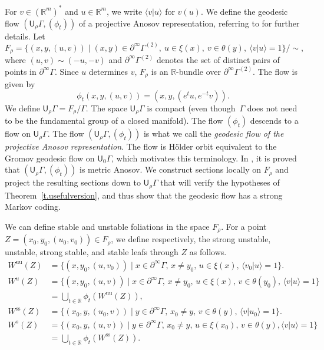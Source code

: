 \documentclass[10pt]{amsart}
\let\sep\mid
\newcommand{\sts}{\mathrm{ss}}
\newcommand{\uu}{\mathrm{uu}}
\theoremstyle{definition}
\numberwithin{equation}{section}
\begin{document}
For $v\in (\mathbb{R}^m)^*$ and $u\in\mathbb{R}^m$, we write $\langle v | u \rangle$ for $v(u)$. We define the geodesic flow $(\mathsf{U}_\rho\Gamma,(\phi_t))$ of a projective Anosov representation, referring to \cite[\S4]{bcls} for further details. Let\vspace*{-3pt}
\[ F_\rho = \bigl\{ (x,y,(u,v)) \sep (x,y)\in\partial^\infty\Gamma^{(2)}, \ u\in \xi(x), \ v\in \theta(y), \ \langle v|u\rangle =1\bigr\}\big/\sim,\]
where $(u,v)\sim(-u,-v)$ and $\partial^\infty\Gamma^{(2)}$ denotes the set of distinct pairs of points in $\partial^\infty\Gamma$. Since $u$ determines $v$, $F_\rho$ is an $\mathbb{R}$-bundle over $\partial^\infty\Gamma^{(2)}$. The flow is given by\vspace*{-3pt}
\[ \phi_t(x,y,(u,v)) = (x,y,(e^tu,e^{-t}v)).\]
We define $\mathsf{U}_\rho\Gamma = F_\rho/\Gamma$. The space $\mathsf{U}_\rho\Gamma$ is compact \cite[Prop.\,4.1]{bcls} (even though~$\Gamma$ does not need to be the fundamental group of a closed manifold). The flow $(\phi_t)$ \hbox{descends} to a flow on $\mathsf{U}_\rho\Gamma$. The flow $(\mathsf{U}_\rho\Gamma, (\phi_t))$ is what we call the \emph{geodesic flow of the projective Anosov representation}. The flow is Hölder orbit equivalent to the \hbox{Gromov} geodesic flow on $\mathsf{U}_0\Gamma$, which motivates this terminology. In \cite[Th.\,1.10]{bcls}, it is proved that $(\mathsf{U}_\rho\Gamma, (\phi_t))$ is metric Anosov. We construct sections locally on $F_\rho$ and project the resulting sections down to $\mathsf{U}_\rho\Gamma$ that will verify the hypotheses of Theorem~\ref{t.usefulversion}, and thus show that the geodesic flow has a strong Markov coding.

We can define stable and unstable foliations in the space $F_\rho$. For a point $Z=(x_0,y_0,(u_0,v_0))\in F_\rho$, we define respectively, the strong unstable, unstable, strong stable, and stable leafs through $Z$ as follows.\vspace*{-3pt}
\begin{align*}
W^{\uu}(Z) &=\{ (x,y_0,(u,v_0)) \sep x\in\partial^\infty\Gamma,\, x\neq y_0,\, u\in\xi(x),\, \langle v_0|u \rangle =1\}. \\
W^u(Z) &=\{ (x,y_0,(u,v)) \sep x\in\partial^\infty\Gamma,\, x\neq y_0,\, u\in\xi(x),\, v\in\theta(y_0),\, \langle v|u \rangle =1\} \\
& = \bigcup_{t\in\mathbb{R}} \phi_t(W^{\uu}(Z)), \\
W^{\sts}(Z) &=\{ (x_0,y,(u_0,v)) \sep y\in\partial^\infty\Gamma,\, x_0\neq y,\, v\in\theta(y),\, \langle v|u_0 \rangle =1\}. \\
W^s (Z) &=\{ (x_0,y,(u,v)) \sep y\in\partial^\infty\Gamma,\, x_0\neq y,\, u\in\xi(x_0),\, v\in\theta(y), \langle v|u \rangle =1\} \\
& = \bigcup_{t\in\mathbb{R}} \phi_t(W^{\sts}(Z)).
\end{align*}
\end{document}
